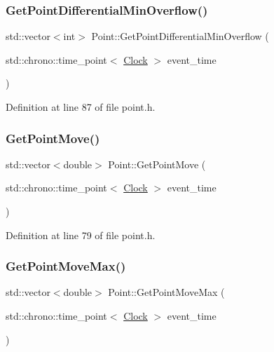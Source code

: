 \subsubsection{\texorpdfstring{Get\+Point\+Differential\+Min\+Overflow()}{GetPointDifferentialMinOverflow()}}
{\footnotesize\ttfamily std\+::vector$<$int$>$ Point\+::\+Get\+Point\+Differential\+Min\+Overflow (\begin{DoxyParamCaption}\item[{std\+::chrono\+::time\+\_\+point$<$ \mbox{\hyperlink{universe_8h_a0ef8d951d1ca5ab3cfaf7ab4c7a6fd80}{Clock}} $>$}]{event\+\_\+time }\end{DoxyParamCaption})\hspace{0.3cm}{\ttfamily [inline]}}



Definition at line 87 of file point.\+h.

\mbox{\label{class_point_a46d06a6d5e8107a0321ede4ca162f264}} 
\subsubsection{\texorpdfstring{Get\+Point\+Move()}{GetPointMove()}}
{\footnotesize\ttfamily std\+::vector$<$double$>$ Point\+::\+Get\+Point\+Move (\begin{DoxyParamCaption}\item[{std\+::chrono\+::time\+\_\+point$<$ \mbox{\hyperlink{universe_8h_a0ef8d951d1ca5ab3cfaf7ab4c7a6fd80}{Clock}} $>$}]{event\+\_\+time }\end{DoxyParamCaption})\hspace{0.3cm}{\ttfamily [inline]}}



Definition at line 79 of file point.\+h.

\mbox{\label{class_point_af67ce3da60a8e3907df6ec193786c2ae}} 
\subsubsection{\texorpdfstring{Get\+Point\+Move\+Max()}{GetPointMoveMax()}}
{\footnotesize\ttfamily std\+::vector$<$double$>$ Point\+::\+Get\+Point\+Move\+Max (\begin{DoxyParamCaption}\item[{std\+::chrono\+::time\+\_\+point$<$ \mbox{\hyperlink{universe_8h_a0ef8d951d1ca5ab3cfaf7ab4c7a6fd80}{Clock}} $>$}]{event\+\_\+time }\end{DoxyParamCaption})\hspace{0.3cm}{\ttfamily [inline]}}



